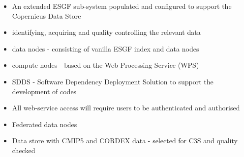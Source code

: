 \documentclass[portrait,a0paper,fontscale=0.4]{baposter} %
\newcommand{\compresslist}{%
\setlength{\itemsep}{1pt}%
\setlength{\parskip}{0pt}%
\setlength{\parsep}{0pt}%
}
\begin{document}
\begin{poster}
{\begin{multicols}{2}
     \begin{itemize}\compresslist
       \item An extended ESGF sub-system populated and configured to support the Copernicus Data Store
       \item identifying, acquiring and quality controlling the relevant data
       \item data nodes - consisting of vanilla ESGF index and data nodes
       \item compute nodes - based on the Web Processing Service (WPS)
       \item SDDS - Software Dependency Deployment Solution to support the development of codes
       \item All web-service access will require users to be authenticated and authorised
       \item Federated data nodes
       \item Data store with CMIP5 and CORDEX data - selected for C3S and quality checked
     \end{itemize}
   \end{multicols}
 }


\end{poster}
\end{document}
